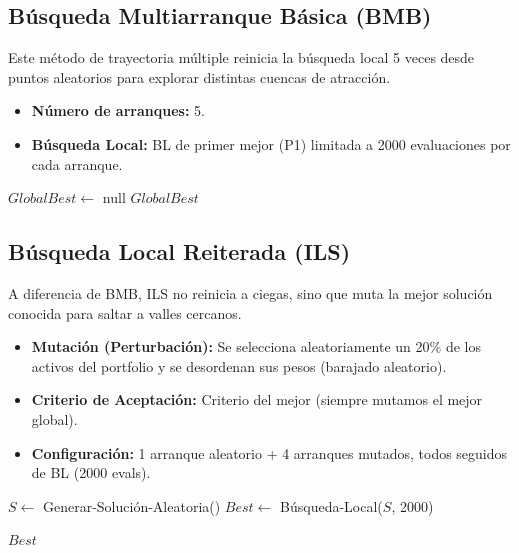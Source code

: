 \subsection{Búsqueda Multiarranque Básica (BMB)}

Este método de trayectoria múltiple reinicia la búsqueda local 5 veces desde 
puntos aleatorios para explorar distintas cuencas de atracción.

\begin{itemize}
    \item \textbf{Número de arranques:} 5.
    \item \textbf{Búsqueda Local:} BL de primer mejor (P1) limitada a 2000 evaluaciones 
    por cada arranque.
\end{itemize}

\begin{algorithm}[H]
\SetAlgoLined
{}

$GlobalBest \leftarrow$ null\;
\Return $GlobalBest$\;
\caption{Búsqueda Multiarranque Básica (BMB)}
\label{alg:bmb}
\end{algorithm}

\subsection{Búsqueda Local Reiterada (ILS)}

A diferencia de BMB, ILS no reinicia a ciegas, sino que muta la mejor solución 
conocida para saltar a valles cercanos.

\begin{itemize}
    \item \textbf{Mutación (Perturbación):} Se selecciona aleatoriamente un 20\% de los 
    activos del portfolio y se desordenan sus pesos (barajado aleatorio).
    \item \textbf{Criterio de Aceptación:} Criterio del mejor (siempre mutamos el mejor global).
    \item \textbf{Configuración:} 1 arranque aleatorio + 4 arranques mutados, todos 
    seguidos de BL (2000 evals).
\end{itemize}

\begin{algorithm}[H]
\SetAlgoLined
{}

$S \leftarrow$ Generar-Solución-Aleatoria()\;
$Best \leftarrow$ Búsqueda-Local($S$, 2000)\;

\Return $Best$\;
\caption{Búsqueda Local Reiterada (ILS)}
\label{alg:ils}
\end{algorithm}

